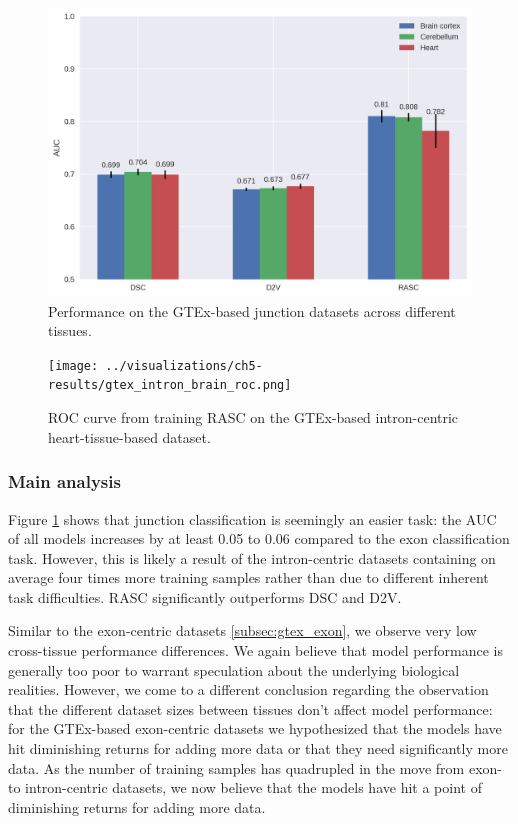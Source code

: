\begin{figure}[h]
	\centering\includegraphics[width=1\textwidth]{../visualizations/ch5-results/gtex_junc_barcharts.png} 
	\caption{Performance on the GTEx-based junction datasets across different tissues. }
	\label{fig:gtex_junc_barcharts}
\end{figure}


\begin{figure}[h]
	\centering\texttt{[image: ../visualizations/ch5-results/gtex\_intron\_brain\_roc.png]} 
	\caption{ROC curve from training RASC on the GTEx-based intron-centric heart-tissue-based dataset. }
	\label{fig:gtex_junc_rocs}
\end{figure}


\subsubsection{Main analysis}
Figure \ref{fig:gtex_junc_barcharts} shows that junction classification is seemingly an easier task: the AUC of all models increases by at least 0.05 to 0.06 compared to the exon classification task. However, this is likely a result of the intron-centric datasets containing on average four times more training samples rather than due to different inherent task difficulties. RASC significantly outperforms DSC and D2V. 

Similar to the exon-centric datasets \ref{subsec:gtex_exon}, we observe very low cross-tissue performance differences. We again believe that model performance is generally too poor to warrant speculation about the underlying biological realities. However, we come to a different conclusion regarding the observation that the different dataset sizes between tissues don't affect model performance:
for the GTEx-based exon-centric datasets we hypothesized that the models have hit diminishing returns for adding more data or that they need significantly more data. As the number of training samples has quadrupled in the move from exon- to intron-centric datasets, we now believe that the models have hit a point of diminishing returns for adding more data. 


